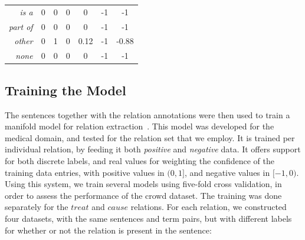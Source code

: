 \begin{table}[htb!]
{\begin{tabular}{rcccccc}
\textit{is a}            & 0  & 0 & 0    & 0    & -1    & -1 \\
\cellcolor{aliceblue}\textit{part of}         & \cellcolor{aliceblue}0  & \cellcolor{aliceblue}0 & \cellcolor{aliceblue}0    & \cellcolor{aliceblue}0    & \cellcolor{aliceblue}-1    & \cellcolor{aliceblue}-1 \\
\textit{other}           & 0  & 1 & 0    & 0.12 & -1    & -0.88 \\
\cellcolor{aliceblue}\textit{none}            & \cellcolor{aliceblue}0  & \cellcolor{aliceblue}0 & \cellcolor{aliceblue}0    & \cellcolor{aliceblue}0    & \cellcolor{aliceblue}-1    & \cellcolor{aliceblue}-1 \\
\bottomrule
\end{tabular}
}
\end{table}


\subsection{Training the Model}

The sentences together with the relation annotations were then used to train a manifold model for relation extraction~\cite{P14-1078}.  This model was developed for the medical domain, and tested for the relation set that we employ.  It is trained per individual relation, by feeding it both \textit{positive} and \textit{negative} data.  It offers support for both discrete labels, and real values for weighting the confidence of the training data entries, with positive values in $(0, 1]$, and negative values in $[-1, 0)$. Using this system, we train several models using five-fold cross validation, in order to assess the performance of the crowd dataset. The training was done separately for the $treat$ and $cause$ relations. For each relation, we constructed four datasets, with the same sentences and term pairs, but with different labels for whether or not the relation is present in the sentence:

